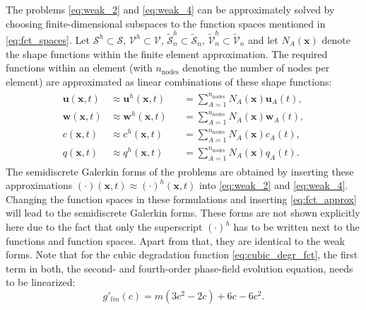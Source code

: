 The problems \eqref{eq:weak_2} and \eqref{eq:weak_4} can be approximately solved by choosing finite-dimensional subspaces to the function spaces mentioned in \eqref{eq:fct_spaces}. Let $\bm{\mathcal{S}}^{h}\subset\bm{\mathcal{S}}$, $\bm{\mathcal{V}}^{h}\subset\bm{\mathcal{V}}$, $\tilde{\mathcal{S}}_{n}^{h}\subset\tilde{\mathcal{S}}_{n}$, $\tilde{\mathcal{V}}_{n}^{h}\subset\tilde{\mathcal{V}}_{n}$ and let $N_{A}\left(\mathbf{x}\right)$ denote the shape functions within the finite element approximation. The required functions within an element (with $n_{\text{nodes}}$ denoting the number of nodes per element) are approximated as linear combinations of these shape functions:
\begin{equation} \label{eq:fct_approx}
	\begin{aligned}
	\begin{alignedat}{2}
		\mathbf{u}\left(\mathbf{x},t\right) &\approx \mathbf{u}^{h}\left(\mathbf{x},t\right) &&= \sum\limits_{A=1}^{n_{\text{nodes}}}N_{A}\left(\mathbf{x}\right)\mathbf{u}_{A}\left(t\right), \\
		\mathbf{w}\left(\mathbf{x},t\right) &\approx \mathbf{w}^{h}\left(\mathbf{x},t\right) &&= \sum\limits_{A=1}^{n_{\text{nodes}}}N_{A}\left(\mathbf{x}\right)\mathbf{w}_{A}\left(t\right), \\
		c\left(\mathbf{x},t\right) &\approx c^{h}\left(\mathbf{x},t\right) &&= \sum\limits_{A=1}^{n_{\text{nodes}}}N_{A}\left(\mathbf{x}\right)c_{A}\left(t\right), \\
		q\left(\mathbf{x},t\right) &\approx q^{h}\left(\mathbf{x},t\right) &&= \sum\limits_{A=1}^{n_{\text{nodes}}}N_{A}\left(\mathbf{x}\right)q_{A}\left(t\right).
	\end{alignedat}
	\end{aligned}
\end{equation}
The semidiscrete Galerkin forms of the problems are obtained by inserting these approxi\-mations $\left(\cdot\right)\left(\mathbf{x},t\right)\approx\left(\cdot\right)^{h}\left(\mathbf{x},t\right)$ into \eqref{eq:weak_2} and \eqref{eq:weak_4}. Changing the function spaces in these formulations and inserting \eqref{eq:fct_approx} will lead to the semidiscrete Galerkin forms. These forms are not shown explicitly here due to the fact that only the superscript $\left(\cdot\right)^{h}$ has to be written next to the functions and function spaces. Apart from that, they are identical to the weak forms. Note that for the cubic degradation function \eqref{eq:cubic_degr_fct}, the first term in both, the second- and fourth-order phase-field evolution equation, needs to be linearized:
\begin{equation} \label{eq:cubic_degr_fct_lin}
		g'_{lin}\left(c\right) = m\left(3c^{2}-2c\right)+6c-6c^{2}.
\end{equation}

